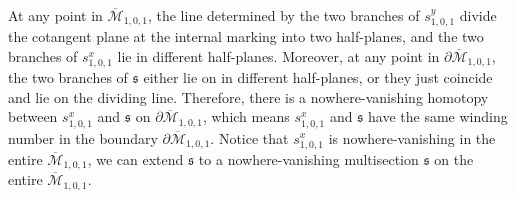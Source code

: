 \documentclass[11pt]{amsart}
\theoremstyle{definition}
\theoremstyle{remark}
\newcommand{\<}{\left<}
\renewcommand{\>}{\right>}
\numberwithin{equation}{section}
\def\Mbar{{\overline{\mathcal M}}}
\begin{document}
At any point in $\Mbar_{1,0,1}$, the line determined by the two branches of $s^y_{1,0,1}$ divide the cotangent plane at the internal marking into two half-planes, and the two branches of $s^x_{1,0,1}$ lie in different half-planes. Moreover, at any point in $\partial \Mbar_{1,0,1}$, the two branches of $\mathfrak s$ either lie on in different half-planes, or they just coincide and lie on the dividing line. Therefore, there is a nowhere-vanishing homotopy between $s^x_{1,0,1}$ and $\mathfrak s$ on $\partial \Mbar_{1,0,1}$, which means $s^x_{1,0,1}$ and $\mathfrak s$ have the same winding number in the boundary $\partial \Mbar_{1,0,1}$.   Notice that $s^x_{1,0,1}$ is nowhere-vanishing in the entire $\Mbar_{1,0,1}$, we can extend $\mathfrak s$ to a nowhere-vanishing multisection $\mathfrak s$ on the entire $\Mbar_{1,0,1}$.
\end{document}
